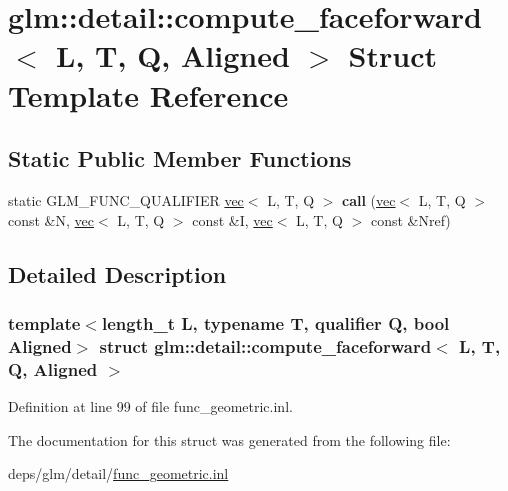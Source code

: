 \hypertarget{structglm_1_1detail_1_1compute__faceforward}{}\section{glm\+:\+:detail\+:\+:compute\+\_\+faceforward$<$ L, T, Q, Aligned $>$ Struct Template Reference}
\label{structglm_1_1detail_1_1compute__faceforward}
\subsection*{Static Public Member Functions}
\begin{DoxyCompactItemize}
\item 
\mbox{\label{structglm_1_1detail_1_1compute__faceforward_a8f885365775eabaea213e3e58d7fe0fd}} 
static G\+L\+M\+\_\+\+F\+U\+N\+C\+\_\+\+Q\+U\+A\+L\+I\+F\+I\+ER \hyperlink{structglm_1_1vec}{vec}$<$ L, T, Q $>$ {\bfseries call} (\hyperlink{structglm_1_1vec}{vec}$<$ L, T, Q $>$ const \&N, \hyperlink{structglm_1_1vec}{vec}$<$ L, T, Q $>$ const \&I, \hyperlink{structglm_1_1vec}{vec}$<$ L, T, Q $>$ const \&Nref)
\end{DoxyCompactItemize}


\subsection{Detailed Description}
\subsubsection*{template$<$length\+\_\+t L, typename T, qualifier Q, bool Aligned$>$\newline
struct glm\+::detail\+::compute\+\_\+faceforward$<$ L, T, Q, Aligned $>$}



Definition at line 99 of file func\+\_\+geometric.\+inl.



The documentation for this struct was generated from the following file\+:\begin{DoxyCompactItemize}
\item 
deps/glm/detail/\hyperlink{func__geometric_8inl}{func\+\_\+geometric.\+inl}\end{DoxyCompactItemize}
